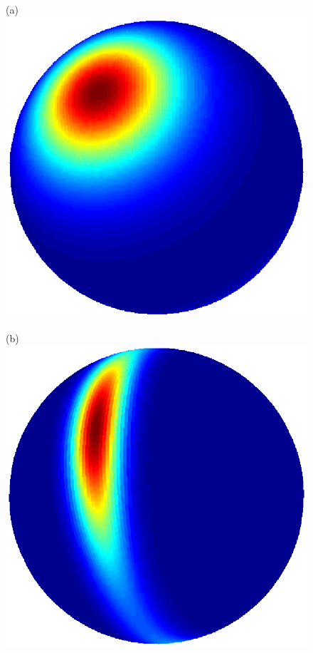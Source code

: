 \documentclass[dvips,aoas,preprint]{imsart}
\numberwithin{equation}{section}
\theoremstyle{plain}
\begin{document}
\begin{figure}[!htbp]
  \begin{minipage}[]{0.10\textwidth}
    \centering
    (a)
    \includegraphics*[width=\textwidth]{inspace1.ps}
  \end{minipage}
  \begin{minipage}[]{0.10\textwidth}
    \centering
    (b)
    \includegraphics*[width=\textwidth]{inspace2.ps}

\end{minipage}
\end{figure}
\end{document}
